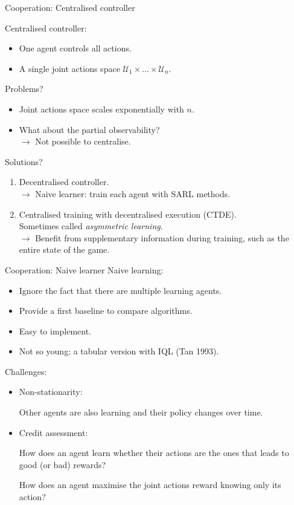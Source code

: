 \documentclass[9pt, hyperref={pdfusetitle,colorlinks=true,allcolors=DarkBlue}]{beamer}
\begin{document}
\begin{frame}{Cooperation: Centralised controller}
\vfill

Centralised controller:
        \begin{itemize}
            \item One agent controls all actions.
            \item A single joint actions space $\mathcal{U}_1 \times ... \times \mathcal{U}_n$.
        \end{itemize}
    \vfill
Problems?
    \pause
    \begin{itemize}
        \item Joint actions space scales exponentially with $n$.
        \item What about the partial observability?\\
        $\rightarrow$ Not possible to centralise.
    \end{itemize}
    \vfill
Solutions?
    \pause
    \begin{enumerate}
        \item Decentralised controller.\\
        $\rightarrow$ Naive learner: train each agent with SARL methods.
        \item Centralised training with decentralised execution (CTDE).\\
        Sometimes called \textit{asymmetric learning}.\\
        $\rightarrow$ Benefit from supplementary information during training, such as the entire state of the game. 
        \end{enumerate}

\end{frame}

\begin{frame}{Cooperation: Naive learner}
Naive learning:
\begin{itemize}
    \item Ignore the fact that there are multiple learning agents.
    \item Provide a first baseline to compare algorithms.
    \item Easy to implement.
    \item Not so young: a tabular version with IQL (Tan 1993).
\end{itemize}
\vfill
Challenges:
\pause
\begin{itemize}
\item Non-stationarity:

Other agents are also learning and their policy changes over time.

\item Credit assessment: 

How does an agent learn whether their actions are the ones that leads to good (or bad) rewards?

How does an agent maximise the joint actions reward knowing only its action?

\end{itemize}
\end{frame}
\end{document}
